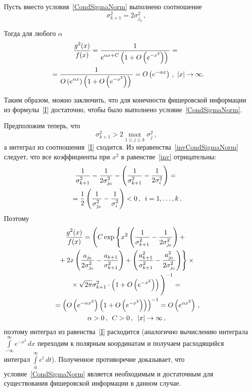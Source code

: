 \begin{multicols}{2}
Пусть вместо условия~\eqref{CondSigmaNorm} выполнено соотношение
$$
\sigma_{k+1}^2=2\sigma_{j_0}^2\,,
$$

\columnbreak


\noindent
Тогда для любого $\alpha$
\begin{multline*}
\displaystyle\frac{\displaystyle g^2(x)\mathstrut}{\displaystyle f(x)\mathstrut} =\displaystyle\frac{\displaystyle 1\mathstrut}{\displaystyle e^{\alpha x+C}
\left(1+O\left(e^{-x^2}\right)\right)\mathstrut}={}\\
{}=\displaystyle\frac{\displaystyle 1\mathstrut}{\displaystyle O\left(e^{\alpha
x}\right)\left(1+O\left(e^{-x^2}\right)\right)\mathstrut}=O\left(e^{-\alpha
x}\right)\,,\ |x|\to\infty.\hspace*{-2.57826pt}
\end{multline*}

Таким образом, можно заключить, что для конечности фишеровской
информации из формулы~\eqref{I} достаточно, чтобы было выполнено
условие~\eqref{CondSigmaNorm}.

Предположим теперь, что
\begin{equation}
\label{invCondSigmaNorm}
\sigma_{k+1}^2>2\max_{1\le j\le
k}\sigma_j^2\,,
\end{equation}
а интеграл из соотношения~\eqref{I} сходится. Из
неравенства~\eqref{invCondSigmaNorm} следует, что все коэффициенты
при $x^2$ в равенстве~\eqref{inv} отрицательны:
\begin{multline*}
\displaystyle\frac{\displaystyle 1\mathstrut}{\displaystyle \sigma_{k+1}^2\mathstrut}-\displaystyle\frac{\displaystyle 1\mathstrut}{\displaystyle 2\sigma_{j_0}^2\mathstrut}-
\left(\displaystyle\frac{\displaystyle 1\mathstrut}{\displaystyle \sigma_{k+1}^2\mathstrut}-\frac{1}{2\sigma_i^2}\right)={}\\
{}=
\displaystyle\frac{\displaystyle 1\mathstrut}{\displaystyle 2\mathstrut}\left(\displaystyle\frac{\displaystyle 1\mathstrut}{\displaystyle \sigma_{j_0}^2\mathstrut}-\displaystyle\frac{\displaystyle 1\mathstrut}{\displaystyle \sigma_i^2\mathstrut}\right)<0\,,\enskip i=1,\ldots,k\,.
\end{multline*}
Поэтому
\begin{multline*}
\displaystyle\frac{\displaystyle g^2(x)\mathstrut}{\displaystyle f(x)\mathstrut}=\Bigg( C\exp\left\{x^2
\left(\displaystyle\frac{\displaystyle 1\mathstrut}{\displaystyle \sigma_{k+1}^2\mathstrut}-\displaystyle\frac{\displaystyle 1\mathstrut}{\displaystyle 2\sigma_{j_0}^2\mathstrut}\right)
+{}\right.\\
\left.{}+2x\left(\displaystyle\frac{\displaystyle a_{j_0}\mathstrut}{\displaystyle 2\sigma_{j_0}^2\mathstrut}-\displaystyle\frac{\displaystyle a_{k+1}\mathstrut}{\displaystyle \sigma_{k+1}^2\mathstrut}\right)
+\left(\displaystyle\frac{\displaystyle a_{k+1}^2\mathstrut}{\displaystyle \sigma_{k+1}^2\mathstrut}-\displaystyle\frac{\displaystyle a_{j_0}^2\mathstrut}{\displaystyle 2\sigma_{j_0}^2\mathstrut}\right)\right\}
\times{}\\
{}\times\sqrt{2\pi}\sigma^2_{k+1}\cdot
\left(1+O\left(e^{-x^2}\right)\right)\Bigg)^{-1}={}\\
{}=\left({O\left(e^{-\alpha
x^2}\right)\left(1+O\left(e^{-x^2}\right)\right)}\right)^{-1}=
O\left(e^{\alpha x^2}\right)\,,\\ \alpha>0\,,\enskip C>0\,,\enskip    |x|\to\infty\,,
\end{multline*}
поэтому интеграл из равенства~\eqref{I} расходится (аналогично
вычислению интеграла $\int\limits_{-\infty}^\infty e^{-x^2}\,dx$ переходим
к полярным координатам и получаем расходящийся интеграл
$\int\limits_0^\infty e^t\,dt$). Полученное противоречие доказывает, что
условие~\eqref{CondSigmaNorm} является необходимым и достаточным для
существования фишеровской информации в данном случае.


\end{multicols}
